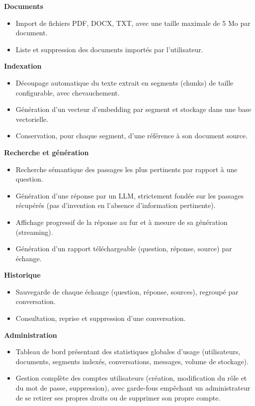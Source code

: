 \documentclass[12pt,a4paper]{article}
\begin{document}
\textbf{Documents}
\begin{itemize}
  \item Import de fichiers PDF, DOCX, TXT, avec une taille maximale de 5 Mo par document.
  \item Liste et suppression des documents importés par l'utilisateur.
\end{itemize}

\textbf{Indexation}
\begin{itemize}
  \item Découpage automatique du texte extrait en segments (chunks) de taille configurable, avec chevauchement.
  \item Génération d'un vecteur d'embedding par segment et stockage dans une base vectorielle.
  \item Conservation, pour chaque segment, d'une référence à son document source.
\end{itemize}

\textbf{Recherche et génération}
\begin{itemize}
  \item Recherche sémantique des passages les plus pertinents par rapport à une question.
  \item Génération d'une réponse par un LLM, strictement fondée sur les passages récupérés (pas d'invention en l'absence d'information pertinente).
  \item Affichage progressif de la réponse au fur et à mesure de sa génération (streaming).
  \item Génération d'un rapport téléchargeable (question, réponse, source) par échange.
\end{itemize}

\textbf{Historique}
\begin{itemize}
  \item Sauvegarde de chaque échange (question, réponse, sources), regroupé par conversation.
  \item Consultation, reprise et suppression d'une conversation.
\end{itemize}

\textbf{Administration}
\begin{itemize}
  \item Tableau de bord présentant des statistiques globales d'usage (utilisateurs, documents, segments indexés, conversations, messages, volume de stockage).
  \item Gestion complète des comptes utilisateurs (création, modification du rôle et du mot de passe, suppression), avec garde-fous empêchant un administrateur de se retirer ses propres droits ou de supprimer son propre compte.
\end{itemize}
\end{document}
